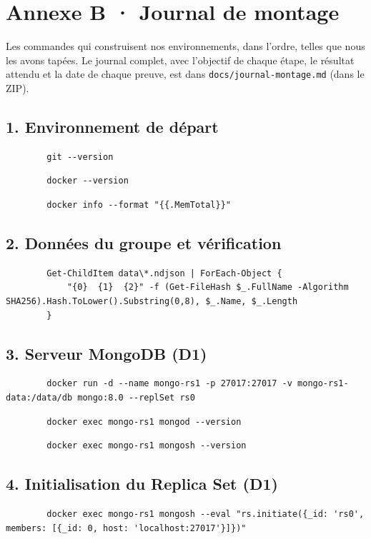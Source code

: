 \documentclass[11pt,a4paper]{article}
\begin{document}
	\endgroup
	
	\clearpage
	\section*{Annexe B · Journal de montage}
	Les commandes qui construisent nos environnements, dans l'ordre, telles que nous les avons tapées. Le journal complet, avec l'objectif de chaque étape, le résultat attendu et la date de chaque preuve, est dans \texttt{docs/journal-montage.md} (dans le ZIP).
	\begingroup\small\sloppy
	\lstset{basicstyle=\ttfamily\scriptsize}
	\subsection*{1. Environnement de départ}
	\begin{lstlisting}
		git --version
	\end{lstlisting}
	\begin{lstlisting}
		docker --version
	\end{lstlisting}
	\begin{lstlisting}
		docker info --format "{{.MemTotal}}"
	\end{lstlisting}
	\subsection*{2. Données du groupe et vérification}
	\begin{lstlisting}
		Get-ChildItem data\*.ndjson | ForEach-Object {
			"{0}  {1}  {2}" -f (Get-FileHash $_.FullName -Algorithm SHA256).Hash.ToLower().Substring(0,8), $_.Name, $_.Length
		}
	\end{lstlisting}
	\subsection*{3. Serveur MongoDB (D1)}
	\begin{lstlisting}
		docker run -d --name mongo-rs1 -p 27017:27017 -v mongo-rs1-data:/data/db mongo:8.0 --replSet rs0
	\end{lstlisting}
	\begin{lstlisting}
		docker exec mongo-rs1 mongod --version
	\end{lstlisting}
	\begin{lstlisting}
		docker exec mongo-rs1 mongosh --version
	\end{lstlisting}
	\subsection*{4. Initialisation du Replica Set (D1)}
	\begin{lstlisting}
		docker exec mongo-rs1 mongosh --eval "rs.initiate({_id: 'rs0', members: [{_id: 0, host: 'localhost:27017'}]})"
	\end{lstlisting}
\end{document}
